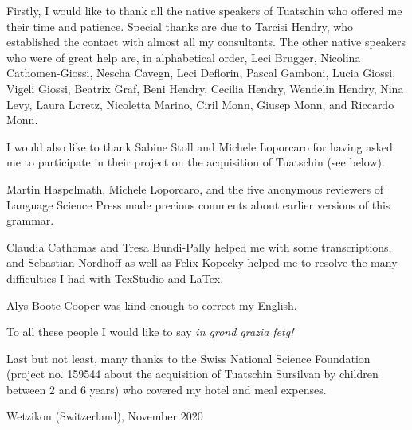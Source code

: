 
Firstly, I would like to thank all the native speakers of Tuatschin who offered me their time and patience. Special thanks are due to Tarcisi Hendry, who established the contact with almost all my consultants. The other native speakers who were of great help are, in alphabetical order, Leci Brugger, Nicolina Cathomen-Giossi, Nescha Cavegn, Leci Deflorin, Pascal Gamboni, Lucia Giossi, Vigeli Giossi, Beatrix Graf, Beni Hendry, Cecilia Hendry, Wendelin Hendry, Nina Levy, Laura Loretz, Nicoletta Marino, Ciril Monn, Giusep Monn, and Riccardo Monn.

I would also like to thank Sabine Stoll and Michele Loporcaro for having asked me to participate in their project on the acquisition of Tuatschin (see below).

Martin Haspelmath, Michele Loporcaro, and the five anonymous reviewers of Language Science Press made precious comments about earlier versions of this grammar.

Claudia Cathomas and Tresa Bundi-Pally helped me with some transcriptions, and Sebastian Nordhoff as well as Felix Kopecky helped me to resolve the many difficulties I had with TexStudio and LaTex.

Alys Boote Cooper was kind enough to correct my English.

To all these people I would like to say \textit{in grond grazia fetg!}

Last but not least, many thanks to the Swiss National Science Foundation (project no. 159544 about the acquisition of Tuatschin Sursilvan by children between 2 and 6 years) who covered my hotel and meal 
expenses.


\begin{flushright}
	Wetzikon (Switzerland), November 2020
\end{flushright}
